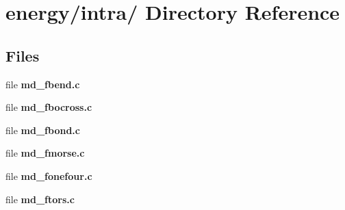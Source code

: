 \section{energy/intra/ Directory Reference}
\label{dir_48bf04e2d30c39780b50896aa8b37193}
\subsection*{Files}
\begin{CompactItemize}
\item 
file {\bf md\_\-fbend.c}
\item 
file {\bf md\_\-fbocross.c}
\item 
file {\bf md\_\-fbond.c}
\item 
file {\bf md\_\-fmorse.c}
\item 
file {\bf md\_\-fonefour.c}
\item 
file {\bf md\_\-ftors.c}
\end{CompactItemize}

